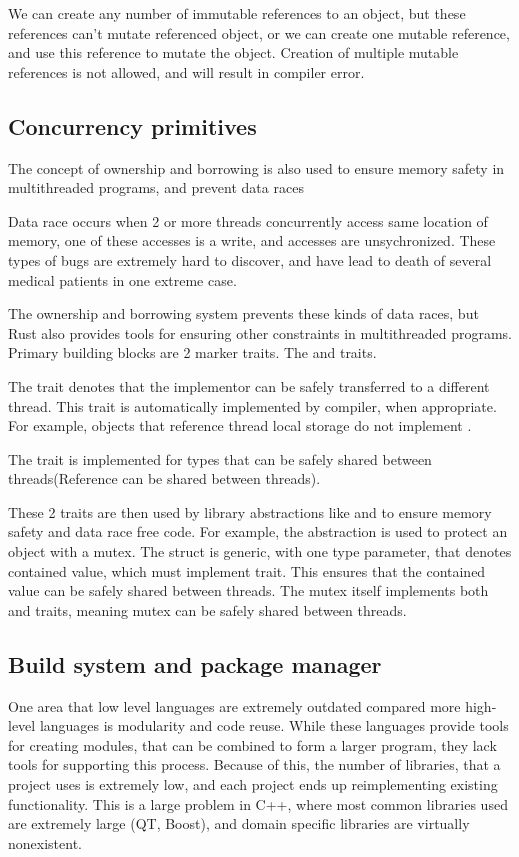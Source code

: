 We can create any number of immutable references to an object, but these references can't mutate referenced object, or
we can create one mutable reference, and use this reference to mutate the object. Creation of multiple mutable references
is not allowed, and will result in compiler error.

\subsection{Concurrency primitives}
The concept of ownership and borrowing is also used to ensure memory safety in multithreaded programs, and prevent
data races

Data race occurs when 2 or more threads concurrently access same location of memory, one of these accesses is a write,
and accesses are unsychronized. These types of bugs are extremely hard to discover, and have lead to death of several medical patients in
one extreme case\cite{article:therac}.

The ownership and borrowing system prevents these kinds of data races, but Rust also provides tools for ensuring other
constraints in multithreaded programs. Primary building blocks are 2 marker traits. The  and  traits.

The  trait denotes that the implementor can be safely transferred to a different thread. This trait is automatically
implemented by compiler, when appropriate. For example, objects that reference thread local storage do not implement .

The  trait is implemented for types that can be safely shared between threads(Reference can be shared between threads).

These 2 traits are then used by library abstractions like  and  to ensure memory safety and data race free code.
For example, the  abstraction is used to protect an object with a mutex. The  struct is generic,
with one type parameter, that denotes contained value, which must implement  trait.
This ensures that the contained value can be safely shared between threads. The mutex itself implements both  and  traits,
meaning mutex can be safely shared between threads.

\subsection{Build system and package manager}
One area that low level languages are extremely outdated compared more high-level languages is modularity and code reuse.
While these languages provide tools for creating modules, that can be combined to form a larger program, they lack tools
for supporting this process. Because of this, the number of libraries, that a project uses is extremely low, and
each project ends up reimplementing existing functionality. This is a large problem in C++, where most common
libraries used are extremely large (QT, Boost), and domain specific libraries are virtually nonexistent.

